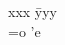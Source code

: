 \documentclass{article}
\begin{document}
\begin{tabbing}
xxx \= yyy \\
\a=o \> \a'e \\
\end{tabbing}
\end{document}

